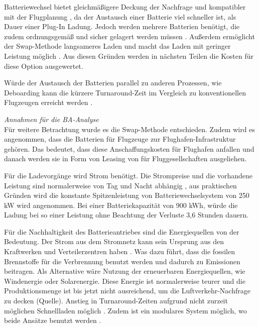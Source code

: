 Batteriewechsel bietet gleichmäßigere Deckung der Nachfrage \cite{guo2020aviation} und kompatibler mit der Flugplanung \cite{salucci2020optimal}, 
da der Austausch einer Batterie viel schneller ist, als Dauer einer Plug-In Ladung. 
Jedoch werden mehrere Batterien benötigt, die zudem ordnungsgemäß und sicher gelagert werden müssen \cite{salucci2020optimal}.
Außerdem ermöglicht der Swap-Methode langsameres Laden und macht das Laden mit geringer Leistung möglich \cite{avogadro2024demystifying}.
Aus diesen Gründen werden in nächsten Teilen die Kosten für diese Option ausgewertet. 

Würde der Austausch der Batterien parallel zu anderen Prozessen, wie Deboarding kann die kürzere Turnaround-Zeit im 
Vergleich zu konventionellen Flugzeugen erreicht werden \cite{schmidt2016challenges}.

\textit{Annahmen für die BA-Analyse}\\

Für weitere Betrachtung wurde es die Swap-Methode entschieden. Zudem wird es angenommen, 
dass die Batterien für Flugzeuge zur Flughafen-Infrastruktur gehören.
Das bedeutet, dass diese Anschaffungskosten für Flughafen anfallen und danach werden sie in Form von Leasing 
von für Fluggesellschaften ausgeliehen.

Für die Ladevorgänge wird Strom benötigt. 
Die Strompreise und die vorhandene Leistung sind normalerweise von Tag und Nacht abhängig \cite{salucci2020optimal}, 
aus praktischen Gründen wird die konstante Spitzenleistung von Batteriewechselsystem von 250 kW wird angenommen. 
Bei einer Batteriekapazität von 900 kWh, würde die Ladung bei so einer Leistung ohne Beachtung der Verluste 3,6 Stunden dauern.

%
Für die Nachhaltigkeit des Batterieantriebes sind die Energiequellen von der Bedeutung. 
Der Strom aus dem Stromnetz kann sein Ursprung aus den Kraftwerken und Verteilerzentren haben \cite{dalmia2022powering}. 
Was dazu führt, dass die fossilen Brennstoffe für die Verbrennung benutzt werden und dadurch zu Emissionen beitragen. 
Als Alternative wäre Nutzung der erneuerbaren Energiequellen, wie Windenergie oder Solarenergie. Diese Energie ist normalerweise teurer
und die Produktionsmenge ist bis jetzt nicht ausreichend, um die Luftverkehr-Nachfrage zu decken (Quelle).
Anstieg in Turnaround-Zeiten aufgrund nicht zurzeit möglichen Schnellladen möglich \cite{avogadro2024demystifying}.
Zudem ist ein modulares System möglich, wo beide Ansätze benutzt werden \cite{salucci2020optimal}.

